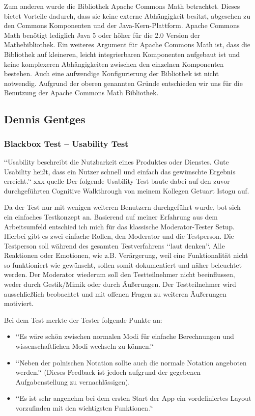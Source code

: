 Zum anderen wurde die Bibliothek Apache Commons Math betrachtet. Dieses bietet Vorteile dadurch, dass sie keine externe Abhängigkeit besitzt, abgesehen zu den Commons Komponenten und der Java-Kern-Plattform. Apache Commons Math benötigt lediglich Java 5 oder höher für die 2.0 Version der Mathebibliothek. Ein weiteres Argument für Apache Commons Math ist, dass die Bibliothek auf kleineren, leicht integrierbaren Komponenten aufgebaut ist und keine komplexeren Abhängigkeiten zwischen den einzelnen Komponenten bestehen. Auch eine aufwendige Konfigurierung der Bibliothek ist nicht notwendig. 
Aufgrund der oberen genannten Gründe entschieden wir uns für die Benutzung der Apache Commons Math Bibliothek.


\subsection{Dennis Gentges}

\subsubsection{Blackbox Test – Usability Test}

‘‘Usability beschreibt die Nutzbarkeit eines Produktes oder Dienstes. Gute Usability heißt, dass ein Nutzer schnell und einfach das gewünschte Ergebnis erreicht.’‘ xxx quelle 
Der folgende Usability Test baute dabei auf den zuvor durchgeführten Cognitive Walkthrough von meinem Kollegen Getuart Istogu auf.

Da der Test nur mit wenigen weiteren Benutzern durchgeführt wurde, bot sich ein einfaches Testkonzept an. Basierend auf meiner Erfahrung aus dem Arbeitsumfeld entschied ich mich für das klassische Moderator-Tester Setup. Hierbei gibt es zwei einfache Rollen, den Moderator und die Testperson. Die Testperson soll während des gesamten Testverfahrens ‘‘laut denken’‘. Alle Reaktionen oder Emotionen, wie z.B. Verärgerung, weil eine Funktionalität nicht so funktioniert wie gewünscht, sollen somit dokumentiert und näher beleuchtet werden. Der Moderator wiederum soll den Testteilnehmer nicht beeinflussen, weder durch Gestik/Mimik oder durch Äußerungen. Der Testteilnehmer wird ausschließlich beobachtet und mit offenen Fragen zu weiteren Äußerungen motiviert. 


Bei dem Test merkte der Tester folgende Punkte an:
\begin{itemize}
	\item ‘‘Es wäre schön zwischen normalen Modi für einfache Berechnungen und wissenschaftlichen Modi wechseln zu können.’‘
	\item ‘‘Neben der polnischen Notation sollte auch die normale Notation angeboten werden.’‘ (Dieses Feedback ist jedoch aufgrund der gegebenen Aufgabenstellung zu vernachlässigen).
	\item ‘‘Es ist sehr angenehm bei dem ersten Start der App ein vordefiniertes Layout vorzufinden mit den wichtigsten Funktionen.’‘
\end{itemize}

